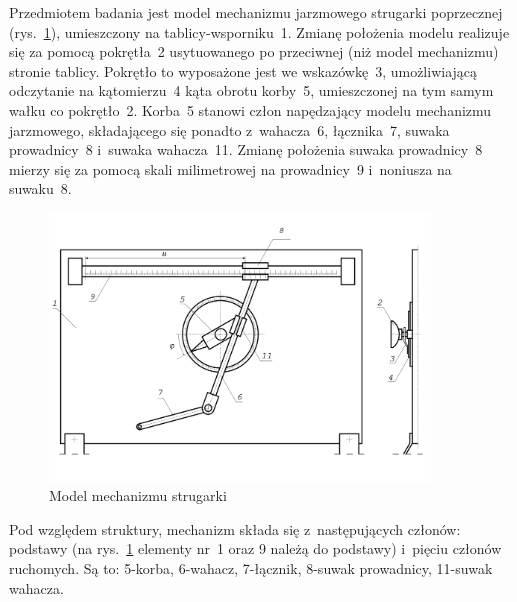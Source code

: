 \documentclass[paper=a4,DIV=12]{tmmlab}
\begin{document}
Przedmiotem badania jest model mechanizmu jarzmowego strugarki poprzecznej
(rys.~\ref{fig:TQIWQ}), umieszczony na tablicy-wsporniku~1. Zmianę położenia
modelu realizuje się za pomocą pokrętła~2 usytuowanego po przeciwnej (niż
model mechanizmu) stronie tablicy. Pokrętło to wyposażone jest we wskazówkę~3,
umożliwiającą odczytanie na kątomierzu~4 kąta obrotu korby~5,
umieszczonej na tym samym wałku co pokrętło~2. Korba~5 stanowi człon
napędzający modelu mechanizmu jarzmowego, składającego się ponadto z~wahacza~6,
łącznika~7, suwaka prowadnicy~8 i~suwaka wahacza~11. Zmianę
położenia suwaka prowadnicy~8 mierzy się za pomocą skali milimetrowej na
prowadnicy~9 i~noniusza na suwaku~8.
\begin{figure}[htbp]
  \centering
  \includegraphics[width=0.9\textwidth]{lab11/strugarka}
  \caption{Model mechanizmu strugarki}
  \label{fig:TQIWQ}
\end{figure}

Pod względem struktury, mechanizm składa się z~następujących członów: podstawy
(na rys.~\ref{fig:TQIWQ} elementy nr~1 oraz 9 należą do podstawy) i~pięciu
członów ruchomych. Są to: 5-korba, 6-wahacz, 7-łącznik, 8-suwak prowadnicy,
11-suwak wahacza.
\end{document}
